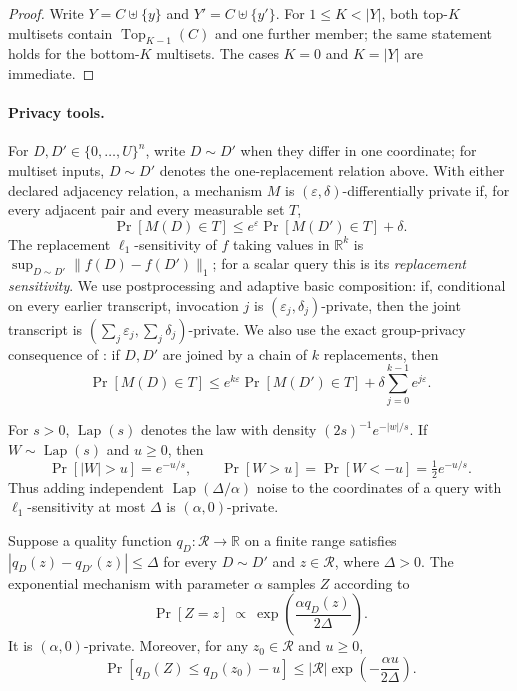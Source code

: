 \documentclass[11pt]{article}
\begin{document}
\begin{proof}
Write $Y=C\uplus\{y\}$ and $Y'=C\uplus\{y'\}$.  For
$1\le K<|Y|$, both top-$K$ multisets contain
$\operatorname{Top}_{K-1}(C)$ and one further member; the same statement
holds for the bottom-$K$ multisets.  The cases $K=0$ and $K=|Y|$ are
immediate.
\end{proof}

\paragraph{Privacy tools.}
For $D,D'\in\{0,\ldots,U\}^n$, write $D\sim D'$ when they differ in one
coordinate; for multiset inputs, $D\sim D'$ denotes the one-replacement
relation above.  With either declared adjacency relation, a mechanism $M$ is
$(\varepsilon,\delta)$-differentially private if, for every adjacent pair
and every measurable set $T$,
\begin{equation}
 \Pr[M(D)\in T]\le e^\varepsilon\Pr[M(D')\in T]+\delta.
 \label{eq:dp-definition}
\end{equation}
The replacement $\ell_1$-sensitivity of $f$ taking values in $\mathbb R^k$
is $\sup_{D\sim D'}\|f(D)-f(D')\|_1$; for a scalar query this is its
\emph{replacement sensitivity}.  We use
postprocessing and adaptive basic composition: if, conditional on every
earlier transcript, invocation $j$ is
$(\varepsilon_j,\delta_j)$-private, then the joint transcript is
$(\sum_j\varepsilon_j,\sum_j\delta_j)$-private.  We also use the exact
group-privacy consequence of : if $D,D'$ are joined
by a chain of $k$ replacements, then
\begin{equation}
 \Pr[M(D)\in T]
 \le e^{k\varepsilon}\Pr[M(D')\in T]
   +\delta\sum_{j=0}^{k-1}e^{j\varepsilon}.
 \label{eq:group-privacy}
\end{equation}

For $s>0$, $\operatorname{Lap}(s)$ denotes the law with density
$(2s)^{-1}e^{-|w|/s}$.  If $W\sim\operatorname{Lap}(s)$ and $u\ge0$, then
\begin{equation}
 \Pr[|W|>u]=e^{-u/s},
 \qquad
 \Pr[W>u]=\Pr[W<-u]=\tfrac12e^{-u/s}.
 \label{eq:laplace-tail}
\end{equation}
Thus adding independent $\operatorname{Lap}(\Delta/\alpha)$ noise to the
coordinates of a query with $\ell_1$-sensitivity at most $\Delta$ is
$(\alpha,0)$-private.

Suppose a quality function $q_D:\mathcal R\to\mathbb R$ on a finite range
satisfies
$|q_D(z)-q_{D'}(z)|\le\Delta$ for every $D\sim D'$ and
$z\in\mathcal R$, where $\Delta>0$.  The exponential mechanism with
parameter $\alpha$ samples $Z$ according to
\[
 \Pr[Z=z]\ \propto\
 \exp\left(\frac{\alpha q_D(z)}{2\Delta}\right).
\]
It is $(\alpha,0)$-private.  Moreover, for any $z_0\in\mathcal R$ and
$u\ge0$,
\begin{equation}
 \Pr[q_D(Z)\le q_D(z_0)-u]
 \le |\mathcal R|\exp\left(-\frac{\alpha u}{2\Delta}\right).
 \label{eq:exponential-tail}
\end{equation}
\end{document}
